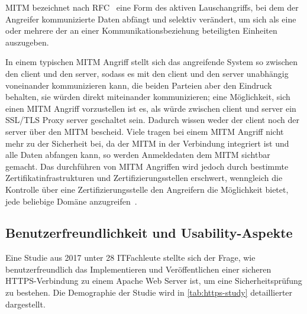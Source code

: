 \begin{definition}
    \ac{MITM} bezeichnet nach \ac{RFC}\ \autocite[Übersetzt aus][]{rfc2828} eine Form des aktiven Lauschangriffs, bei dem der Angreifer kommunizierte Daten abfängt und selektiv verändert, um sich als eine oder mehrere der an einer Kommunikationsbeziehung beteiligten Einheiten auszugeben.
\end{definition}

In einem typischen \ac{MITM} Angriff stellt sich das angreifende System so zwischen den \gls{client} und den \gls{server}, sodass es mit den \gls{client} und den \gls{server} unabhängig voneinander kommunizieren kann, die beiden Parteien aber den Eindruck behalten, sie würden direkt miteinander kommunizieren; eine Möglichkeit, sich einen \ac{MITM} Angriff vorzustellen ist es, als würde zwischen \gls{client} und \gls{server} ein \ac{SSL}/\ac{TLS} Proxy \gls{server} geschaltet sein.\autocite[\vglf][]{greenwood2014smv} Dadurch wissen weder der \gls{client} noch der \gls{server} über den \ac{MITM} bescheid.
Viele  tragen bei einem \ac{MITM} Angriff nicht mehr zu der Sicherheit bei, da der \ac{MITM} in der Verbindung integriert ist und alle Daten abfangen kann, so werden \zb Anmeldedaten dem \ac{MITM} sichtbar gemacht.\autocite[\vglf][]{greenwood2014smv}
Das durchführen von \ac{MITM} Angriffen wird jedoch durch bestimmte Zertifikatinfrastrukturen und Zertifizierungsstellen erschwert, wenngleich die Kontrolle über eine Zertifizierungsstelle den Angreifern die Möglichkeit bietet, jede beliebige Domäne anzugreifen\ \autocite[\vglf][\pagef ]{10.1007/978-3-642-33167-1_13}.

\subsection[Benutzerfreundlichkeit und Usability-Aspekte]{Benutzerfreundlichkeit und Usability-Aspekte}\label{subsec:benutzerfreundlichkeit_und_usability-aspekte}
Eine Studie aus 2017 unter 28 IT\nonbreakdash Fachleute stellte sich der Frage, wie benutzerfreundlich das Implementieren und Veröffentlichen einer sicheren \ac{HTTPS}-Verbindung zu einem Apache Web Server ist, um eine Sicherheitsprüfung zu bestehen.\autocite[\vglf][]{usabilityHTTPS:2017}
Die Demographie der Studie wird in \autoref{tab:https-study} detaillierter dargestellt.

